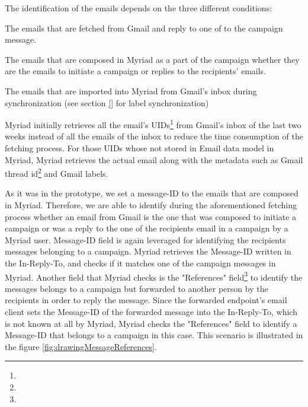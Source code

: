 The identification of the emails depends on the three different conditions:

\begin{compactenum}
	\item The emails that are fetched from Gmail and reply to one of to the campaign message.
	\item The emails that are composed in Myriad as a part of the campaign whether they are the emails to initiate a campaign or replies to the recipients' emails.
	\item The emails that are imported into Myriad from Gmail's inbox during synchronization (see section \ref{} for label synchronization)
\end{compactenum}

Myriad initially retrieves all the email's \ac{UID}s\footnote{} from Gmail's inbox of the last two weeks instead of all the emails of the inbox to reduce the time consumption of the fetching process. For those \ac{UID}s whose not stored in Email data model in Myriad, Myriad retrieves the actual email along with the metadata such as Gmail thread id\footnote{} and Gmail labels.
\vspace{1cm}

As it was in the prototype, we set a message-ID to the emails that are composed in Myriad. Therefore, we are able to identify during the aforementioned fetching process whether an email from Gmail is the one that was composed to initiate a campaign or was a reply to the one of the recipients email in a campaign by a Myriad user. Message-ID field is again leveraged for identifying the recipients messages belonging to a campaign. Myriad retrieves the Message-ID written in the In-Reply-To, and checks if it matches one of the campaign messages in Myriad. Another field that Myriad checks is the "References" field\footnote{} to identify the messages belongs to a campaign but forwarded to another person by the recipients in order to reply the message. Since the forwarded endpoint's email client sets the Message-ID of the forwarded message into the In-Reply-To, which is not known at all by Myriad, Myriad checks the "References" field to identify a Message-ID that belongs to a campaign in this case. This scenario is illustrated in the figure \ref{fig:drawingMessageReferences}.

